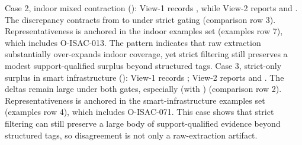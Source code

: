 {}Case 2, indoor mixed contraction (): View-1 records , while View-2 reports  and . The discrepancy contracts from  to  under strict gating (comparison row \markdownRendererHash{}3). Representativeness is anchored in the indoor  examples set (examples row \markdownRendererHash{}7), which includes  O-ISAC-013. The pattern indicates that raw extraction substantially over-expands indoor coverage, yet strict filtering still preserves a modest support-qualified surplus beyond structured tags.\markdownRendererParagraphSeparator
{}Case 3, strict-only surplus in smart infrastructure (): View-1 records ; View-2 reports  and . The deltas remain large under both gates, especially  (with ) (comparison row \markdownRendererHash{}2). Representativeness is anchored in the smart-infrastructure  examples set (examples row \markdownRendererHash{}4), which includes  O-ISAC-071. This case shows that strict filtering can still preserve a large body of support-qualified evidence beyond structured tags, so disagreement is not only a raw-extraction artifact.\markdownRendererParagraphSeparator
